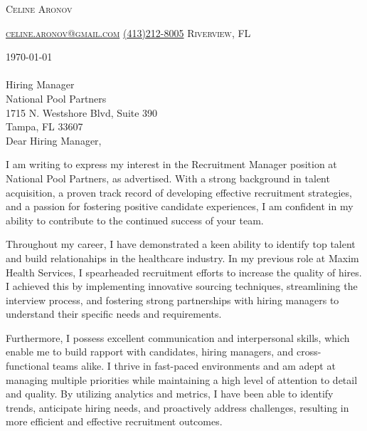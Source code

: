 \documentclass[12pt]{letter}
\makeatletter
\def\myname{Celine Aronov}
\def\myemail{celine.aronov@gmail.com}
\def\myphone{(413)212-8005}
\def\mylocation{Riverview, FL}
\def\hiringManager{Hiring Manager}
\def\companyName{National Pool Partners}
\def\companyAddress{1715 N. Westshore Blvd, Suite 390}
\def\companyCity{Tampa, FL 33607}
\newcommand{\addressHeading}[4]{
    {#1}\\
    {#2}\\
    {#3}\\
    {#4}\\
}
\newcommand{\greeting}{
    \vspace{-0.1in}Dear \hiringManager,
}
\makeatother
\begin{document}
\AddToShipoutPictureBG{%
\color{gr}
\AtPageUpperLeft{\rule[-1.3in]{\paperwidth}{1.3in}}
}

\begin{center}
{\fontsize{28}{0}\selectfont\scshape \myname}

\fontsize{10}{0}\selectfont\scshape \href{mailto:\myemail}{\faEnvelope\enspace \myemail}\hfill
\fontsize{10}{0}\selectfont\scshape \href{tel:\myphone}{\faPhone\enspace \myphone}\hfill
\fontsize{10}{0}\selectfont\scshape \faMapMarker\enspace \mylocation
\end{center}

\vspace{0.2in}

\today
\\ \\
\addressHeading{\hiringManager}{\companyName}{\companyAddress}{\companyCity}

\greeting


I am writing to express my interest in the Recruitment Manager position at \companyName, as advertised. With a strong background in talent acquisition, a proven track record of developing effective recruitment strategies, and a passion for fostering positive candidate experiences, I am confident in my ability to contribute to the continued success of your team.

Throughout my career, I have demonstrated a keen ability to identify top talent and build relationahips in the healthcare industry. In my previous role at Maxim Health Services, I spearheaded recruitment efforts to increase the quality of hires. I achieved this by implementing innovative sourcing techniques, streamlining the interview process, and fostering strong partnerships with hiring managers to understand their specific needs and requirements.

Furthermore, I possess excellent communication and interpersonal skills, which enable me to build rapport with candidates, hiring managers, and cross-functional teams alike. I thrive in fast-paced environments and am adept at managing multiple priorities while maintaining a high level of attention to detail and quality. By utilizing analytics and metrics, I have been able to identify trends, anticipate hiring needs, and proactively address challenges, resulting in more efficient and effective recruitment outcomes.
\end{document}
